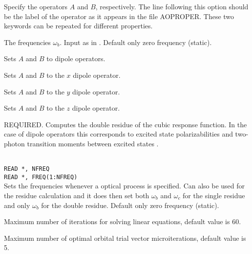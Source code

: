\begin{description}

\item[, ]
Specify the operators $A$ and $B$, respectively. The line following this
option should be the label of the operator as it appears in the file
AOPROPER. These two keywords can be repeated for different properties.

\item[]
The frequencies
$\omega_b$. Input as in .
Default only zero frequency (static).

\item{}
Sets $A$ and  $B$ to dipole operators.

\item{}
Sets $A$ and $B$ to the $x$ dipole operator.

\item{}
Sets $A$ and $B$ to the $y$ dipole operator.

\item{}
Sets $A$ and $B$ to the $z$ dipole operator.

\item{}
REQUIRED.
Computes the double residue of the cubic
response function.
In the case of dipole operators this corresponds to excited
state polarizabilities and two-photon transition
moments 
between excited states \cite{djpnylhajcp105}.

\item{}\\
\verb|READ *, NFREQ|\\
\verb|READ *, FREQ(1:NFREQ)|\\
Sets the frequencies whenever a optical process is specified.
Can also be used for the residue calculation and it does then set 
both $\omega_b$ and $\omega_c$ for the single residue and only
$\omega_b$ for the double residue.
Default only zero frequency (static).

\item{}
Maximum number of iterations for solving linear equations, default value is 60.

\item{}
Maximum number of optimal orbital trial vector microiterations,
default value is 5. 


\end{description}

